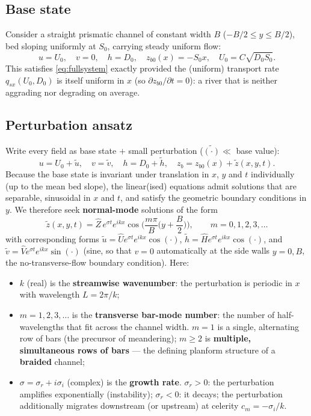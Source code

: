 \documentclass[11pt,a4paper]{report}
\theoremstyle{definition}
\theoremstyle{plain}
\theoremstyle{remark}
\begin{document}
\subsection{Base state}
Consider a straight prismatic channel of constant width $B$ ($-B/2\le y\le B/2$), bed sloping uniformly at $S_0$, carrying steady uniform flow:
\begin{equation}
u=U_0,\quad v=0,\quad h=D_0,\quad z_{b0}(x) = -S_0 x, \quad U_0 = C\sqrt{D_0 S_0}.
\label{eq:basestate}
\end{equation}
This satisfies \eqref{eq:fullsystem} exactly provided the (uniform) transport rate $q_{sx}(U_0,D_0)$ is itself uniform in $x$ (so $\partial z_{b0}/\partial t=0$): a river that is neither aggrading nor degrading on average.

\subsection{Perturbation ansatz}
Write every field as base state $+$ small perturbation ($\tilde{(\cdot)} \ll$ base value):
\begin{equation}
u=U_0+\tilde u,\quad v=\tilde v,\quad h=D_0+\tilde h,\quad z_b = z_{b0}(x)+\tilde z(x,y,t).
\end{equation}
Because the base state is invariant under translation in $x$, $y$ and $t$ individually (up to the mean bed slope), the linear(ised) equations admit solutions that are separable, sinusoidal in $x$ and $t$, and satisfy the geometric boundary conditions in $y$. We therefore seek \textbf{normal-mode} solutions of the form
\begin{equation}
\tilde z(x,y,t) = \widehat Z\, e^{\sigma t}e^{ikx}\cos\!\Big(\frac{m\pi}{B}\Big(y+\frac{B}{2}\Big)\Big), \qquad m=0,1,2,3,\dots
\label{eq:ansatz}
\end{equation}
with corresponding forms $\tilde u=\widehat U e^{\sigma t}e^{ikx}\cos(\cdot)$, $\tilde h=\widehat H e^{\sigma t}e^{ikx}\cos(\cdot)$, and $\tilde v = \widehat V e^{\sigma t}e^{ikx}\sin(\cdot)$ (sine, so that $v=0$ automatically at the side walls $y=0,B$, the no-transverse-flow boundary condition). Here:
\begin{itemize}[nosep]
\item $k$ (real) is the \textbf{streamwise wavenumber}: the perturbation is periodic in $x$ with wavelength $L=2\pi/k$;
\item $m=1,2,3,\dots$ is the \textbf{transverse bar-mode number}: the number of half-wavelengths that fit across the channel width. $m=1$ is a single, alternating row of bars (the precursor of meandering); $m\ge2$ is \textbf{multiple, simultaneous rows of bars} --- the defining planform structure of a \textbf{braided} channel;
\item $\sigma=\sigma_r+i\sigma_i$ (complex) is the \textbf{growth rate}. $\sigma_r>0$: the perturbation amplifies exponentially (instability); $\sigma_r<0$: it decays; the perturbation additionally migrates downstream (or upstream) at celerity $c_m = -\sigma_i/k$.
\end{itemize}
\end{document}
